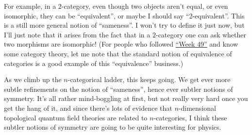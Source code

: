 \documentclass[12pt]{article}
\begin{document}
For example, in a \(2\)-category, even though two objects aren't equal,
or even isomorphic, they can be ``equivalent'', or maybe I should say
``2-equivalent''. This is a still more general notion of ``sameness''. I
won't try to define it just now, but I'll just note that it arises from
the fact that in a \(2\)-category one can ask whether two morphisms are
isomorphic! (For people who followed \protect\hyperlink{week49}{``Week
49''} and know some category theory, let me note that the standard
notion of equivalence of categories is a good example of this
``equivalence'' business.)

As we climb up the \(n\)-categorical ladder, this keeps going. We get
ever more subtle refinements on the notion of ``sameness'', hence ever
subtler notions of symmetry. It's all rather mind-boggling at first, but
not really very hard once you get the hang of it, and since there's lots
of evidence that \(n\)-dimensional topological quantum field theories
are related to \(n\)-categories, I think these subtler notions of
symmetry are going to be quite interesting for physics.
\end{document}
